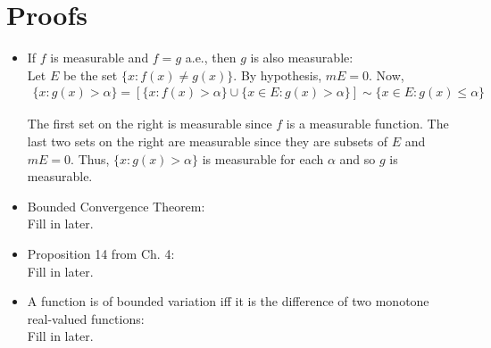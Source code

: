 \documentclass[12pt]{article}
\begin{document}
\newpage
\section{Proofs}

\begin{itemize}

\item If $f$ is measurable and $f = g$ a.e., then $g$ is also measurable:\\

Let $E$ be the set $\{x: f(x) \neq g(x)\}$. By hypothesis, $mE = 0$. Now,
\begin{align*}
\{x: g(x) > \alpha\} = \left[\{x: f(x) > \alpha\} \cup \{x \in E: g(x) > \alpha\}\right] \sim \{x \in E: g(x) \leq \alpha\}
\end{align*}

The first set on the right is measurable since $f$ is a measurable function. The last two sets on the right are measurable since they are subsets of $E$ and $mE = 0$. Thus, $\{x: g(x) > \alpha\}$ is measurable for each $\alpha$ and so $g$ is measurable.
\\
\item Bounded Convergence Theorem:\\

Fill in later.
\\
\item Proposition 14 from Ch. 4:\\

Fill in later.
\\
\item A function is of bounded variation iff it is the difference of two monotone real-valued functions:\\

Fill in later.

\end{itemize}
\end{document}
